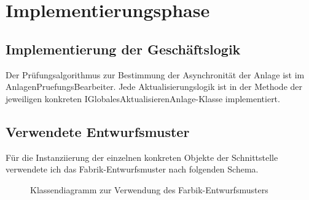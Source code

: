 \clearpage
\section{Implementierungsphase} 
\label{sec:Implementierungsphase}

\subsection{Implementierung der Geschäftslogik}
\label{sec:ImplementierungGeschaeftslogik}

Der Prüfungsalgorithmus zur Bestimmung der Asynchronität der Anlage ist im AnlagenPruefungsBearbeiter.
Jede Aktualisierungslogik ist in der Methode  der jeweiligen konkreten IGlobalesAktualisierenAnlage-Klasse implementiert.

\subsection{Verwendete Entwurfsmuster}
\label{sec:Entwurfsmuster}

Für die Instanziierung der einzelnen konkreten Objekte der Schnittstelle  verwendete ich das Fabrik-Entwurfsmuster nach folgenden Schema.
\begin{figure}
	\centering
	\caption{Klassendiagramm zur Verwendung des Farbik-Entwurfsmusters}
\end{figure}


%



